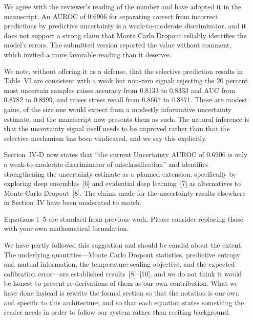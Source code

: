\response We agree with the reviewer's reading of the number and have
adopted it in the manuscript. An AUROC of 0.6906 for separating correct
from incorrect predictions by predictive uncertainty is a
weak-to-moderate discriminator, and it does not support a strong claim
that Monte Carlo Dropout reliably identifies the model's errors. The
submitted version reported the value without comment, which invited a
more favorable reading than it deserves.

We note, without offering it as a defense, that the selective prediction
results in Table~VI are consistent with a weak but non-zero signal:
rejecting the 20 percent most uncertain samples raises accuracy from
0.8133 to 0.8333 and AUC from 0.8782 to 0.8999, and raises stress recall
from 0.8667 to 0.8871. These are modest gains, of the size one would
expect from a modestly informative uncertainty estimate, and the
manuscript now presents them as such. The natural inference is that the
uncertainty signal itself needs to be improved rather than that the
selective mechanism has been vindicated, and we say this explicitly.

\begin{changesblock}
Section~IV-D now states that ``the current Uncertainty AUROC of
0.6906 is only a weak-to-moderate discriminator of misclassification''
and identifies strengthening the uncertainty estimate as a planned
extension, specifically by exploring deep ensembles~[6]
and evidential deep learning~[7] as alternatives to Monte
Carlo Dropout~[8]. The claims made for the
uncertainty results elsewhere in Section~IV have been moderated to match.
\end{changesblock}


\begin{reviewercomment}
Equations 1--5 are standard from previous work. Please consider replacing
those with your own mathematical formulation.
\end{reviewercomment}

\response We have partly followed this suggestion and should be candid
about the extent. The underlying quantities---Monte Carlo Dropout
statistics, predictive entropy and mutual information, the
temperature-scaling objective, and the expected calibration error---are
established results~[8]--[10], and we do not think it would be honest to present
re-derivations of them as our own contribution. What we have done instead
is rewrite the formal section so that the notation is our own and
specific to this architecture, and so that each equation states something
the reader needs in order to follow our system rather than reciting
background.

